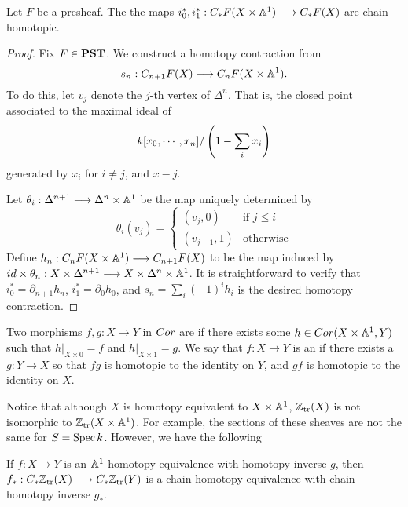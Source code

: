 \begin{lem}\label{lem_hi_implies_i0_i1_homotopic}
Let $F$ be a presheaf. The the maps $i_0^*, i_1^* : 
\suslC F(X \times \A^1) \to \suslC F(X)$ are chain homotopic.
\end{lem}
\begin{proof}
Fix $F \in \PST$. We construct a homotopy contraction from
\[
s_n : \suslC[n + 1] F(X) \to \suslC[n] F(X \times \A^1).
\]
To do this, let $v_j$ denote the $j$-th vertex of $\Delta^n$. That
is, the closed point associated to the maximal ideal of
\[
\basefield [x_0,\cdots,x_{n}]/\left(1 - \sum_{i} x_i \right)
\]
generated by $x_i$ for $i \neq j$, and $x - j$.

Let $\theta_i: \Delta^{n + 1} \to \Delta^n \times \A^1$ be the map
uniquely determined by
\[
\theta_i(v_j) = \begin{cases}
(v_j, 0) & \textrm{if }j \leq i \\
(v_{j - 1}, 1) & \textrm{otherwise}
\end{cases}
\]
Define $h_n : \suslC[n] F(X \times \A^1) \to \suslC[n + 1] F(X)$ 
to be the map induced by $id \times \theta_n : X \times 
\Delta^{n + 1} \to X \times \Delta^n \times \A^1$. It is 
straightforward to verify that $i_0^* = \partial_{n + 1}h_n$,
$i_1^* = \partial_0 h_0$, and $s_n = \sum_i (-1)^i h_i$ is the 
desired homotopy contraction.
\end{proof}

\begin{defn}
Two morphisms $f, g: X \to Y$ in $\Cor$ are  
if there exists some $h \in \Cor(X \times \A^1, Y)$ such that 
$h|_{X \times 0} = f$ and $h|_{X \times 1} = g$. We say that $f: X 
\to Y$ is an  if there exists a 
$g: Y \to X$ so that $fg$ is homotopic to the identity on $Y$, and
$gf$ is homotopic to the identity on $X$.
\end{defn}

Notice that although $X$ is homotopy equivalent to $X \times \A^1$,
$\Ztr(X)$ is not isomorphic to $\Ztr(X \times \A^1)$. For example,
the sections of these sheaves are not the same for $S = \Spec 
\basefield$. However, we have the following

\begin{prop}\label{prop_a1_hom_implies_hom}
If $f: X \to Y$ is an $\A^1$-homotopy equivalence with homotopy
inverse $g$, then $f_*: \suslC \Ztr(X) \to \suslC \Ztr(Y)$ is a 
chain homotopy equivalence with chain homotopy inverse $g_*$.
\end{prop}

